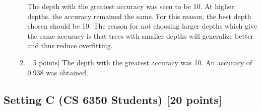 \begin{enumerate}
\begin{enumerate}
  The depth with the greatest accuracy was seen to be 10. At higher depths, the accuracy remained the same. For this reason, the best depth chosen should be 10. The reason for not choosing larger depths which give the same accuracy is that trees with smaller depths will generalize better and thus reduce overfitting.
    
  \item ~[5 points]  The depth with the greatest accuracy was 10. An accuracy of 0.938 was obtained. 	
  \end{enumerate}
  
\end{enumerate}

\subsection*{Setting C (CS 6350 Students) [20 points]}

